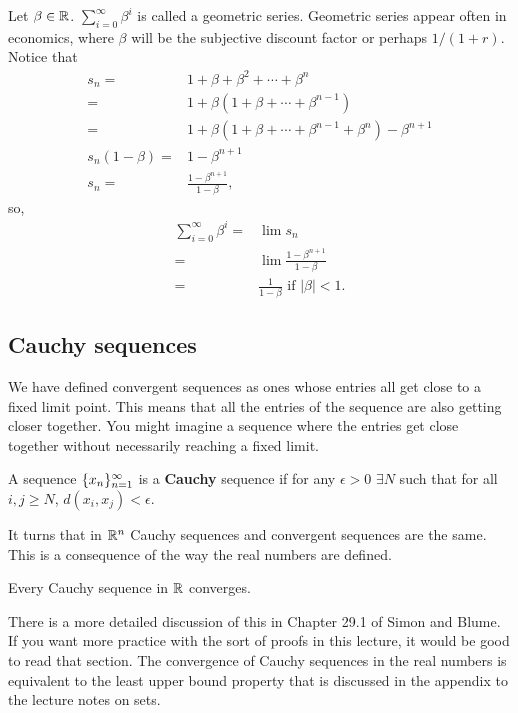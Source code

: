 \begin{example}
  Let $\beta \in \mathbb{R}$. $\sum_{i=0}^\infty \beta^i$ is called a
  geometric series. Geometric series appear often in
  economics, where $\beta$ will be the subjective discount factor or
  perhaps $1/(1+r)$.  Notice  that
  \begin{align*}
    s_n = & 1 + \beta + \beta^2 + \cdots + \beta^n \\
    = & 1 + \beta ( 1 + \beta + \cdots + \beta^{n-1} ) \\
    = & 1 + \beta ( 1 + \beta + \cdots + \beta^{n-1} + \beta^n) -
    \beta^{n+1} \\
    s_n(1 - \beta) = & 1 - \beta^{n+1} \\
    s_n = & \frac{1 - \beta^{n+1}}{1-\beta} ,
  \end{align*}
  so, 
  \begin{align*}
    \sum_{i=0}^\infty \beta^i = & \lim s_n \\
    = & \lim \frac{1 - \beta^{n+1}}{1-\beta} \\
    = & \frac{1}{1-\beta} \text{ if } |\beta|<1.
  \end{align*}
\end{example}


\subsection{Cauchy sequences}

We have defined convergent sequences as ones whose entries all get
close to a fixed limit point. This means that all the entries of the
sequence are also getting closer together. You might imagine a
sequence where the entries get close together without necessarily
reaching a fixed limit.
\begin{definition}
  A sequence $\{{x}_n \}_{n=1}^\infty$ is a \textbf{Cauchy} sequence if for any
  $\epsilon > 0$ $\exists N$ such that for all $i,j\geq N$,
  $d(x_i,x_j) < \epsilon$.
\end{definition}
It turns that in $\mathbb{R}^n$ Cauchy sequences and convergent sequences are
the same. This is a consequence of the way the real numbers are
defined.  
\begin{assumption}
  Every Cauchy sequence in $\mathbb{R}$ converges.
\end{assumption}
There is a more detailed discussion of this in Chapter 29.1 of Simon
and Blume. If you want more practice with the sort of proofs in this
lecture, it would be good to read that section. The convergence of
Cauchy sequences in the real numbers is equivalent to the least upper
bound property that is discussed in the appendix to the lecture notes
on sets.

